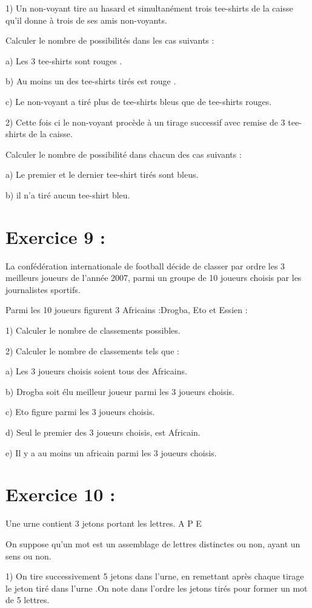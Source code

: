 \documentclass[12pt]{article}
\begin{document}
1) Un non-voyant tire au hasard et simultanément trois tee-shirts de la caisse qu’il donne à trois de ses amis non-voyants.

Calculer le  nombre de possibilités dans les cas suivants :

  a)  Les 3 tee-shirts sont rouges .
  
  b) Au moins un des tee-shirts tirés est rouge .
  
  c) Le non-voyant a tiré plus de tee-shirts bleus que de tee-shirts rouges.
  
 2) Cette fois ci le non-voyant procède à un tirage successif avec remise de 3 tee-shirts de la caisse.
 
    Calculer le nombre de possibilité dans chacun des cas suivants :
    
  a) Le premier et le dernier tee-shirt tirés sont bleus.
  
  b)  il n’a tiré aucun tee-shirt bleu.
\section*{Exercice 9 :}
La confédération internationale  de football décide de classer par ordre les 3 meilleurs joueurs de l’année 2007, parmi un groupe de 10 joueurs choisis par les journalistes sportifs. 

 Parmi les 10 joueurs figurent 3 Africains :Drogba, Eto et Essien :
 
  1) Calculer le nombre de classements possibles.
  
  2) Calculer le nombre de classements tels que :
  
  a) Les 3 joueurs choisis soient  tous des Africains.
  
  b) Drogba soit élu meilleur joueur parmi les 3 joueurs choisis.
  
  c) Eto figure parmi les 3 joueurs choisis.
  
  d) Seul le premier des 3 joueurs choisis, est Africain.
  
  e) Il y a au moins un africain parmi les 3 joueurs choisis.
\section*{Exercice 10 :}  
Une urne contient 3 jetons portant les lettres. A P E

On suppose qu’un mot est un assemblage de lettres distinctes ou non, ayant un sens ou non. 

 1) On tire successivement 5 jetons dans l’urne, en remettant après  chaque tirage le jeton tiré  dans l’urne .On note dans l’ordre les jetons tirés pour former un mot de 5 lettres.
 
\end{document}
